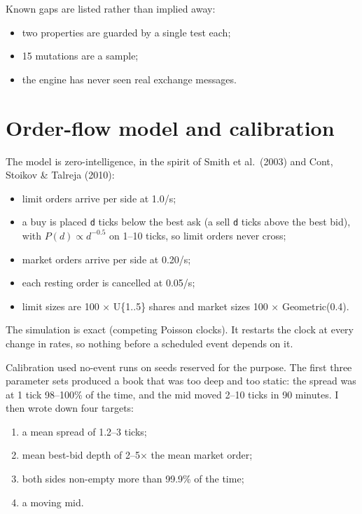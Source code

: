 \documentclass[11pt]{article}
\providecommand{\tightlist}{\setlength{\itemsep}{0pt}\setlength{\parskip}{0pt}}
\begin{document}
Known gaps are listed rather than implied away:

\begin{itemize}
\tightlist
\item
  two properties are guarded by a single test each;
\item
  15 mutations are a sample;
\item
  the engine has never seen real exchange messages.
\end{itemize}

\hypertarget{order-flow-model-and-calibration}{%
\section{Order-flow model and calibration}\label{order-flow-model-and-calibration}}

The model is zero-intelligence, in the spirit of Smith et al.~(2003) and
Cont, Stoikov \& Talreja (2010):

\begin{itemize}
\tightlist
\item
  limit orders arrive per side at 1.0/s;
\item
  a buy is placed \texttt{d} ticks below the best ask (a sell \texttt{d} ticks above
  the best bid), with \(P(d) \propto d^{-0.5}\) on 1--10 ticks, so limit orders
  never cross;
\item
  market orders arrive per side at 0.20/s;
\item
  each resting order is cancelled at 0.05/s;
\item
  limit sizes are 100 × U\{1..5\} shares and market sizes
  100 × Geometric(0.4).
\end{itemize}

The simulation is exact (competing Poisson clocks). It restarts the
clock at every change in rates, so nothing before a scheduled event
depends on it.

Calibration used no-event runs on seeds reserved for the purpose. The
first three parameter sets produced a book that was too deep and too
static: the spread was at 1 tick 98--100\% of the time, and the mid moved
2--10 ticks in 90 minutes. I then wrote down four targets:

\begin{enumerate}
\def\labelenumi{\arabic{enumi}.}
\tightlist
\item
  a mean spread of 1.2--3 ticks;
\item
  mean best-bid depth of 2--5× the mean market order;
\item
  both sides non-empty more than 99.9\% of the time;
\item
  a moving mid.
\end{enumerate}
\end{document}
